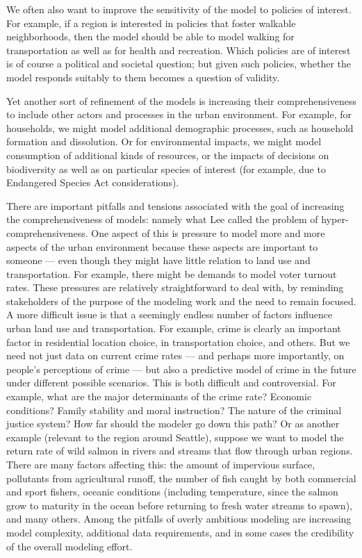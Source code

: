 We often also want to improve the sensitivity of the model to policies of
interest.  For example, if a region is interested in policies that foster
walkable neighborhoods, then the model should be able to model walking for
transportation as well as for health and recreation.  Which policies are of
interest is of course a political and societal question; but given such
policies, whether the model responds suitably to them becomes a question of
validity.

Yet another sort of refinement of the models is increasing their
comprehensiveness to include other actors and processes in the urban
environment.  For example, for households, we might model additional
demographic processes, such as household formation and dissolution.
Or for environmental impacts, we might model consumption of
additional kinds of resources, or the impacts of decisions on
biodiversity as well as on particular species of interest (for
example, due to Endangered Species Act considerations).

There are important pitfalls and tensions associated with the goal of
increasing the comprehensiveness of models: namely what Lee \cite{lee-1973}
called the problem of hyper-comprehensiveness.  One aspect of this is
pressure to model more and more aspects of the urban environment because
these aspects are important to someone --- even though they might have
little relation to land use and transportation.  For example, there might
be demands to model voter turnout rates.  These pressures are relatively
straightforward to deal with, by reminding stakeholders of the purpose of
the modeling work and the need to remain focused.  A more difficult issue
is that a seemingly endless number of factors influence urban land use and
transportation.  For example, crime is clearly an important factor in
residential location choice, in transportation choice, and others.  But we
need not just data on current crime rates --- and perhaps more importantly,
on people's perceptions of crime --- but also a predictive model of crime
in the future under different possible scenarios.  This is both difficult
and controversial.  For example, what are the major determinants of the
crime rate?  Economic conditions?  Family stability and moral instruction?
The nature of the criminal justice system?  How far should the modeler go
down this path?  Or as another example (relevant to the region around
Seattle), suppose we want to model the return rate of wild salmon in rivers
and streams that flow through urban regions.  There are many factors
affecting this: the amount of impervious surface, pollutants from
agricultural runoff, the number of fish caught by both commercial and sport
fishers, oceanic conditions (including temperature, since the salmon grow
to maturity in the ocean before returning to fresh water streams to spawn),
and many others.  Among the pitfalls of overly ambitious modeling are
increasing model complexity, additional data requirements, and in some
cases the credibility of the overall modeling effort.

